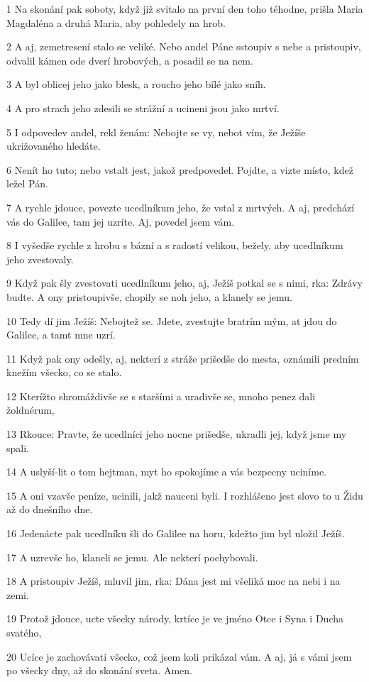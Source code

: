 \par 1 Na skonání pak soboty, když již svitalo na první den toho téhodne, prišla Maria Magdaléna a druhá Maria, aby pohledely na hrob.
\par 2 A aj, zemetresení stalo se veliké. Nebo andel Páne sstoupiv s nebe a pristoupiv, odvalil kámen ode dverí hrobových, a posadil se na nem.
\par 3 A byl oblicej jeho jako blesk, a roucho jeho bílé jako sníh.
\par 4 A pro strach jeho zdesili se strážní a ucineni jsou jako mrtví.
\par 5 I odpovedev andel, rekl ženám: Nebojte se vy, nebot vím, že Ježíše ukrižovaného hledáte.
\par 6 Nenít ho tuto; nebo vstalt jest, jakož predpovedel. Pojdte, a vizte místo, kdež ležel Pán.
\par 7 A rychle jdouce, povezte ucedlníkum jeho, že vstal z mrtvých. A aj, predchází vás do Galilee, tam jej uzríte. Aj, povedel jsem vám.
\par 8 I vyšedše rychle z hrobu s bázní a s radostí velikou, bežely, aby ucedlníkum jeho zvestovaly.
\par 9 Když pak šly zvestovati ucedlníkum jeho, aj, Ježíš potkal se s nimi, rka: Zdrávy budte. A ony pristoupivše, chopily se noh jeho, a klanely se jemu.
\par 10 Tedy dí jim Ježíš: Nebojtež se. Jdete, zvestujte bratrím mým, at jdou do Galilee, a tamt mne uzrí.
\par 11 Když pak ony odešly, aj, nekterí z stráže prišedše do mesta, oznámili predním knežím všecko, co se stalo.
\par 12 Kterížto shromáždivše se s staršími a uradivše se, mnoho penez dali žoldnérum,
\par 13 Rkouce: Pravte, že ucedlníci jeho nocne prišedše, ukradli jej, když jsme my spali.
\par 14 A uslyší-lit o tom hejtman, myt ho spokojíme a vás bezpecny uciníme.
\par 15 A oni vzavše peníze, ucinili, jakž nauceni byli. I rozhlášeno jest slovo to u Židu až do dnešního dne.
\par 16 Jedenácte pak ucedlníku šli do Galilee na horu, kdežto jim byl uložil Ježíš.
\par 17 A uzrevše ho, klaneli se jemu. Ale nekterí pochybovali.
\par 18 A pristoupiv Ježíš, mluvil jim, rka: Dána jest mi všeliká moc na nebi i na zemi.
\par 19 Protož jdouce, ucte všecky národy, krtíce je ve jméno Otce i Syna i Ducha svatého,
\par 20 Ucíce je zachovávati všecko, což jsem koli prikázal vám. A aj, já s vámi jsem po všecky dny, až do skonání sveta. Amen.


